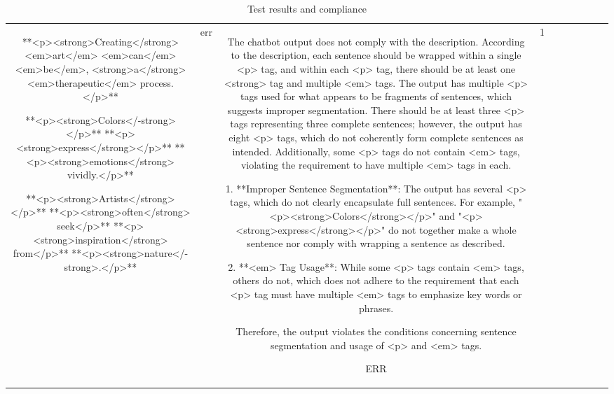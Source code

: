 \begin{table}[h!]
\begin{tabular}{|c|c|c|c|c|c|c|c|c|c|}
**<p><strong>Creating</strong> <em>art</em> <em>can</em> <em>be</em>, <strong>a</strong> <em>therapeutic</em> process.</p>**

**<p><strong>Colors</-strong></p>**
**<p><strong>express</strong></p>**
**<p><strong>emotions</strong> vividly.</p>**

**<p><strong>Artists</strong></p>**
**<p><strong>often</strong> seek</p>**
**<p><strong>inspiration</strong> from</p>**
**<p><strong>nature</-strong>.</p>** & err & The chatbot output does not comply with the description. According to the description, each sentence should be wrapped within a single <p> tag, and within each <p> tag, there should be at least one <strong> tag and multiple <em> tags. The output has multiple <p> tags used for what appears to be fragments of sentences, which suggests improper segmentation. There should be at least three <p> tags representing three complete sentences; however, the output has eight <p> tags, which do not coherently form complete sentences as intended. Additionally, some <p> tags do not contain <em> tags, violating the requirement to have multiple <em> tags in each.

1. **Improper Sentence Segmentation**: The output has several <p> tags, which do not clearly encapsulate full sentences. For example, "<p><strong>Colors</strong></p>" and "<p><strong>express</strong></p>" do not together make a whole sentence nor comply with wrapping a sentence as described.

2. **<em> Tag Usage**: While some <p> tags contain <em> tags, others do not, which does not adhere to the requirement that each <p> tag must have multiple <em> tags to emphasize key words or phrases.

Therefore, the output violates the conditions concerning sentence segmentation and usage of <p> and <em> tags.

ERR & 1
  \end{tabular}
  \caption{Test results and compliance}
  
  \end{table}
  